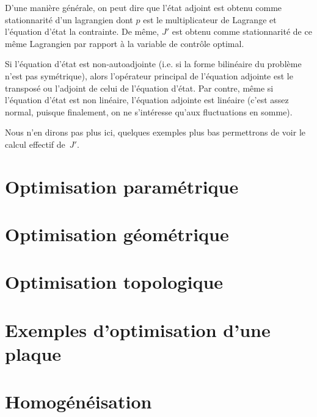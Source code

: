D'une manière générale, on peut dire que l'état adjoint est obtenu comme stationnarité d'un lagrangien dont $p$ est le multiplicateur de Lagrange et l'équation d'état la contrainte.
De même, $J'$ est obtenu comme stationnarité de ce même Lagrangien par rapport à la variable de contrôle optimal.

Si l'équation d'état est non-autoadjointe (i.e. si la forme bilinéaire du problème n'est pas symétrique), alors l'opérateur principal de l'équation adjointe est le transposé ou l'adjoint de celui de l'équation d'état.
Par contre, même si l'équation d'état est non linéaire, l'équation adjointe est linéaire (c'est assez normal, puisque finalement, on ne s'intéresse qu'aux fluctuations en somme).

Nous n'en dirons pas plus ici, quelques exemples plus bas permettrons de voir le calcul effectif de~$J'$.


\medskip
\section{Optimisation paramétrique}






\medskip
\section{Optimisation géométrique}

\medskip
\section{Optimisation topologique}

\medskip
\section{Exemples d'optimisation d'une plaque}

\medskip
\section{Homogénéisation}